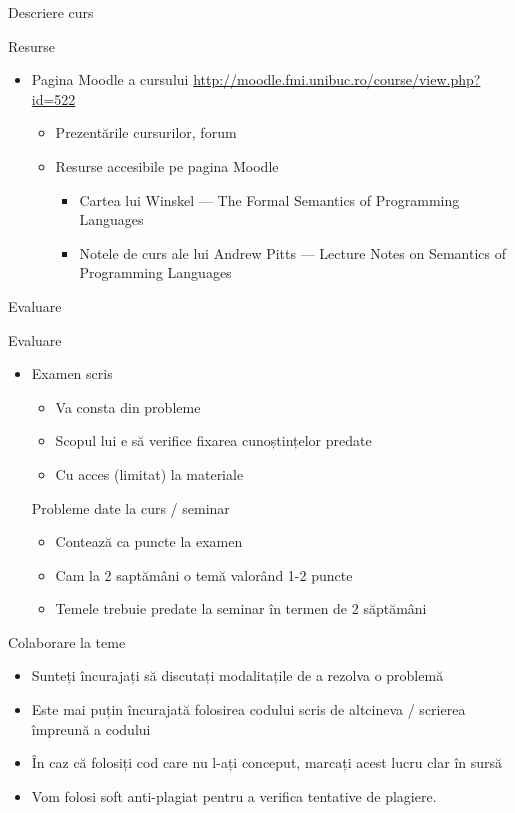\documentclass[xcolor=pdftex,romanian,colorlinks]{beamer}
\begin{document}
\begin{section}{Descriere curs}
\begin{frame}{Resurse}
\begin{itemize}
\item Pagina Moodle a cursului \url{http://moodle.fmi.unibuc.ro/course/view.php?id=522} 
\begin{itemize}
\item Prezentările cursurilor, forum
\item Resurse accesibile pe pagina Moodle
\begin{itemize}
\item Cartea lui Winskel --- The Formal Semantics of Programming Languages
\item Notele de curs ale lui Andrew Pitts --- Lecture Notes on Semantics of Programming Languages
\end{itemize}
\end{itemize}
\end{itemize}
\end{frame}
\end{section}


\begin{section}{Evaluare}
\begin{frame}{Evaluare}
\begin{itemize}
\item Examen scris
\begin{itemize}
\item Va consta din probleme
\item Scopul lui e să verifice fixarea cunoștințelor predate
\item Cu acces (limitat) la materiale 
\end{itemize}
\vitem Probleme date la curs / seminar
\begin{itemize}
\item Contează ca puncte la examen
\item Cam la 2 saptămâni o temă valorând 1-2 puncte
\item Temele trebuie predate la seminar în termen de 2 săptămâni
\end{itemize}
\end{itemize}
\end{frame}

\begin{frame}{Colaborare la teme}
\begin{itemize}
\item Sunteți încurajați să discutați modalitațile de a rezolva o problemă
\item Este mai puțin încurajată folosirea codului scris de altcineva / scrierea împreună a codului
\item În caz că folosiți cod care nu l-ați conceput, marcați acest lucru clar în sursă
\item Vom folosi soft anti-plagiat pentru a verifica tentative de plagiere.
\end{itemize}
\end{frame}

\end{section}
\end{document}
